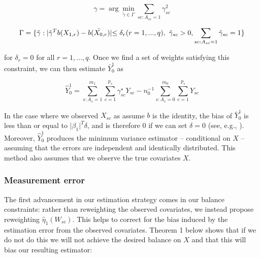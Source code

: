 \documentclass[aoas]{imsart}
\theoremstyle{plain}
\theoremstyle{remark}
\begin{document}
\begin{equation}\label{eqn:objective}
\gamma = \arg\min_{\tilde{\gamma} \in \Gamma} \sum_{sc: A_{sc} = 1} \gamma_{sc}^2
\end{equation}

\begin{equation}\label{eqn:constraint}
\Gamma = \{\tilde{\gamma}: \lvert \tilde{\gamma}^T b(X_{1, r}) - \bar{b(X_{0, r})} \lvert \le \delta_r \\ (r = 1, ..., q), \ \tilde{\gamma}_{sc} > 0, \sum_{sc: A_{sc} = 1}\tilde{\gamma}_{sc} = 1\}
\end{equation}

for $\delta_r = 0$ for all $r = 1, ..., q$. Once we find a set of weights satisfying this constraint, we can then estimate $\bar{Y}_0^1$ as

\begin{equation}\label{eqn:psi}
\hat{Y}_0^1 = \sum_{s: A_s = 1}^{m_1}\sum_{c = 1}^{p_s}\gamma_{sc}^\star Y_{sc} - n_0^{-1}\sum_{s: A_s = 0}^{m_0}\sum_{c = 1}^{p_s}Y_{sc}
\end{equation}

In the case where we observed $X_{sc}$ as assume $b$ is the identity, the bias of $\bar{Y}^1_0$ is less than or equal to $\lvert\beta_1\rvert^T\delta$, and is therefore 0 if we can set $\delta = 0$ (see, e.g., \cite{zubizarreta2015stable}). Moreover, $\hat{Y}_0^1$ produces the minimum variance estimator -- conditional on $X$ -- assuming that the errors are independent and identically distributed. This method also assumes that we observe the true covariates $X$.

\subsubsection{Measurement error}\label{ssec:methodsmsrment}

The first advancement in our estimation strategy comes in our balance constraints: rather than reweighting the observed covariates, we instead propose reweighting $\hat{\eta}_1(W_{sc})$. This helps to correct for the bias induced by the estimation error from the observed covariates. Theorem 1 below shows that if we do not do this we will not achieve the desired balance on $X$ and that this will bias our resulting estimator:
\end{document}
